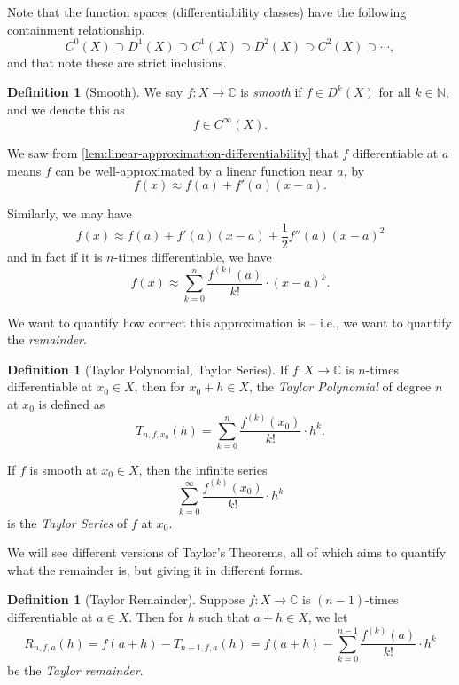 \documentclass[11pt]{article}
\numberwithin{equation}{section}
\theoremstyle{definition}
\newtheorem{definition}[theorem]{Definition}
\theoremstyle{remark}
\newcommand{\pqty}[1]{\left(#1\right)}
\newcommand{\functiondomain}[3]{#1:#2\to #3}
\newcommand{\CC}{\mathbb C}
\newcommand{\NN}{\mathbb N}
\newcommand{\contClass}[1]{C^{#1}}
\newcommand{\diffClass}[1]{D^{#1}}
\newcommand{\smoothClass}{C^\infty}
\begin{document}
Note that the function spaces (differentiability classes) have the following containment relationship.
\[
    \contClass{0}\pqty{X} \supset \diffClass{1}\pqty{X} \supset \contClass{1}\pqty{X} \supset \diffClass{2}\pqty{X} \supset \contClass{2}\pqty{X} \supset \cdots,
\]
and that note these are strict inclusions.

\begin{definition}[Smooth]\label{analysis-unit-0125}
    \label{def:smooth}%
    We say \(\functiondomain{f}{X}{\CC}\) is \emph{smooth} if \(f \in \diffClass{k}\pqty{X}\) for all \(k \in \NN\), and we denote this as
    \[
        f \in \smoothClass \pqty{X}.
    \]
\end{definition}

We saw from \autoref{lem:linear-approximation-differentiability} that \(f\) differentiable at \(a\) means \(f\) can be well-approximated by a linear function near \(a\), by
\[
    f\pqty{x} \approx f\pqty{a} + f'\pqty{a} \pqty{x - a}.
\]

Similarly, we may have
\[
    f\pqty{x} \approx f\pqty{a} + f'\pqty{a} \pqty{x - a} + \frac{1}{2} f''\pqty{a} \pqty{x - a}^2
\]
and in fact if it is \(n\)-times differentiable, we have
\[
    f\pqty{x} \approx \sum_{k = 0}^{n} \frac{f^{\pqty{k}} \pqty{a}}{k!} \cdot \pqty{x - a}^{k}.
\]

We want to quantify how correct this approximation is -- i.e., we want to quantify the \emph{remainder}.

\begin{definition}[Taylor Polynomial, Taylor Series]\label{analysis-unit-0126}
    \label{def:taylor-polynomial-series}%
    If \(\functiondomain{f}{X}{\CC}\) is \(n\)-times differentiable at \(x_0 \in X\), then for \(x_0 + h \in X\), the \emph{Taylor Polynomial} of degree \(n\) at \(x_0\) is defined as
    \[
        T_{n, f, x_0} \pqty{h} = \sum_{k = 0}^{n} \frac{f^{\pqty{k}} \pqty{x_0}}{k!} \cdot h^{k}.
    \]

    If \(f\) is smooth at \(x_0 \in X\), then the infinite series
    \[
        \sum_{k = 0}^{\infty} \frac{f^{\pqty{k}} \pqty{x_0}}{k!} \cdot h^{k}
    \]
    is the \emph{Taylor Series} of \(f\) at \(x_0\).
\end{definition}

We will see different versions of Taylor's Theorems, all of which aims to quantify what the remainder is, but giving it in different forms.

\begin{definition}[Taylor Remainder]\label{analysis-unit-0127}
    Suppose \(\functiondomain{f}{X}{\CC}\) is \(\pqty{n - 1}\)-times differentiable at \(a \in X\). Then for \(h\) such that \(a+h\in X\), we let
    \[
        R_{n, f, a} \pqty{h} = f\pqty{a + h} - T_{n - 1, f, a} \pqty{h} = f\pqty{a + h} - \sum_{k = 0}^{n - 1} \frac{f^{\pqty{k}} \pqty{a}}{k!} \cdot h^k
    \]
    be the \emph{Taylor remainder}.
\end{definition}
\end{document}
